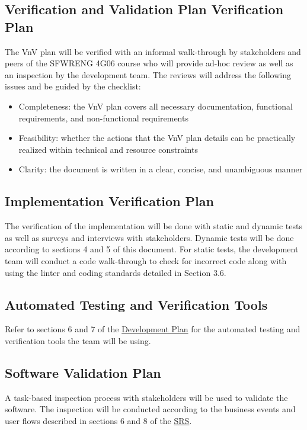 \documentclass[12pt, titlepage]{article}
\begin{document}
\subsection{Verification and Validation Plan Verification Plan}
The VnV plan will be verified with an informal walk-through by stakeholders and peers of the SFWRENG 4G06 course who will provide ad-hoc review as well as an inspection by the development team. The reviews will address the following issues and be guided by the checklist:
\begin{itemize}
    \item Completeness: the VnV plan covers all necessary documentation, functional requirements, and non-functional requirements
    \item Feasibility: whether the actions that the VnV plan details can be practically realized within technical and resource constraints
    \item Clarity: the document is written in a clear, concise, and unambiguous manner
\end{itemize}

\subsection{Implementation Verification Plan}
The verification of the implementation will be done with static and dynamic tests as well as surveys and interviews with stakeholders. Dynamic tests will be done according to sections 4 and 5 of this document. For static tests, the development team will conduct a code walk-through to check for incorrect code along with using the linter and coding standards detailed in Section 3.6.

\subsection{Automated Testing and Verification Tools}
Refer to sections 6 and 7 of the \href{https://github.com/r-yeh/grocery-spending-tracker/blob/master/docs/DevelopmentPlan/DevelopmentPlan.pdf}{Development Plan} for the automated testing and verification tools the team will be using.

\subsection{Software Validation Plan}
A task-based inspection process with stakeholders will be used to validate the software. The inspection will be conducted according to the business events and user flows described in sections 6 and 8 of the \href{https://github.com/r-yeh/grocery-spending-tracker/blob/master/docs/SRS/SRS.pdf}{SRS}.
\end{document}
